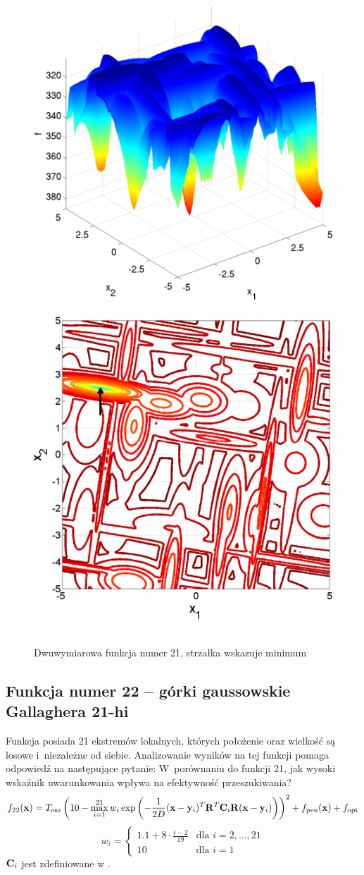 \documentclass[a4paper,onecolumn,oneside,12pt,wide,floatssmall]{mwrep}
\theoremstyle{definition}
\theoremstyle{plain}%
\theoremstyle{remark}
\begin{document}
\begin{figure}[H]
\centering
\mbox{
\includegraphics[width=.45\textwidth]{img/21.png} \quad
\includegraphics[width=.45\textwidth]{img/21a.png} 
}
\caption{Dwuwymiarowa funkcja numer 21, strzałka wskazuje minimum \cite{noiseless}}
\end{figure}

\subsection{Funkcja numer 22 -- górki gaussowskie Gallaghera 21-hi}

Funkcja posiada 21 ekstremów lokalnych, których położenie oraz wielkość są losowe i~niezależne od siebie.
Analizowanie wyników na tej funkcji pomaga odpowiedź na następujące pytanie: W~porównaniu do funkcji 21, jak 
wysoki wskaźnik uwarunkowania wpływa na efektywność przeszukiwania?
$$ f_{22}(\bold{x}) = T_\text{osz}\left(10-\max_{i=1}^{21}w_i\exp\left(-\frac{1}{2D}(\bold{x}-\bold{y}_i)^T\bold{R}^T\bold{C}_i\bold{R}(\bold{x}-\bold{y}_i)\right)\right)^2 + f_\text{pen}(\bold{x}) + f_\text{opt} $$
\[
w_i =
\begin{cases} 
1.1 + 8 \cdot \frac{i-2}{19} & \mbox{dla } i = 2, \dots, 21 \\ 
10 & \mbox{dla } i = 1
\end{cases}
\] 
$\bold{C}_i$ jest zdefiniowane w \cite{noiseless}. 
\end{document}
